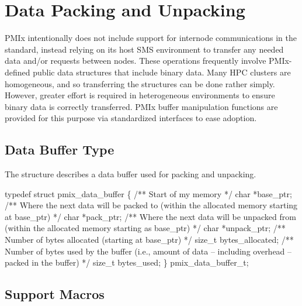 \chapter{Data Packing and Unpacking}
\label{chap:api_data_mgmt}

\ac{PMIx} intentionally does not include support for internode communications in the standard, instead relying on its host \ac{SMS} environment to transfer any needed data and/or requests between nodes. These operations frequently involve PMIx-defined public data structures that include binary data. Many \ac{HPC} clusters are homogeneous, and so transferring the structures can be done rather simply. However, greater effort is required in heterogeneous environments to ensure binary data is correctly transferred. \ac{PMIx} buffer manipulation functions are provided for this purpose via standardized interfaces to ease adoption.

\section{Data Buffer Type}

The  structure describes a data buffer used for packing and unpacking.

\cspecificstart
\begin{codepar}
typedef struct pmix_data_buffer \{
    /** Start of my memory */
    char *base_ptr;
    /** Where the next data will be packed to
        (within the allocated memory starting
        at base_ptr) */
    char *pack_ptr;
    /** Where the next data will be unpacked
        from (within the allocated memory
        starting as base_ptr) */
    char *unpack_ptr;
    /** Number of bytes allocated (starting
        at base_ptr) */
    size_t bytes_allocated;
    /** Number of bytes used by the buffer
        (i.e., amount of data -- including
        overhead -- packed in the buffer) */
    size_t bytes_used;
\} pmix_data_buffer_t;
\end{codepar}
\cspecificend


\section{Support Macros}
\label{chap:datamgt:macros}

